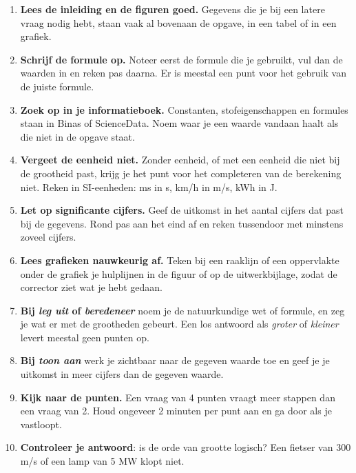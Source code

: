 {\small\opmaakproza
\begin{enumerate}[leftmargin=1.5em,itemsep=3pt,label=\textcolor{kleur1}{\sffamily\bfseries\arabic*}]
\item \textbf{Lees de inleiding en de figuren goed.} Gegevens die je bij een latere vraag nodig hebt, staan vaak
  al bovenaan de opgave, in een tabel of in een grafiek.
\item \textbf{Schrijf de formule op.} Noteer eerst de formule die je gebruikt, vul dan de waarden in en reken pas daarna.
  Er is meestal een punt voor het gebruik van de juiste formule.
\item \textbf{Zoek op in je informatieboek.} Constanten, stofeigenschappen en formules staan in Binas of ScienceData.
  Noem waar je een waarde vandaan haalt als die niet in de opgave staat.
\item \textbf{Vergeet de eenheid niet.} Zonder eenheid, of met een eenheid die niet bij de grootheid past, krijg je het
  punt voor het completeren van de berekening niet. Reken in SI-eenheden: ms in s, km/h in m/s, kWh in J.
\item \textbf{Let op significante cijfers.} Geef de uitkomst in het aantal cijfers dat past bij de gegevens.
  Rond pas aan het eind af en reken tussendoor met minstens zoveel cijfers.
\item \textbf{Lees grafieken nauwkeurig af.} Teken bij een raaklijn of een oppervlakte onder de grafiek je hulplijnen
  in de figuur of op de uitwerkbijlage, zodat de corrector ziet wat je hebt gedaan.
\item \textbf{Bij \emph{leg uit} of \emph{beredeneer}} noem je de natuurkundige wet of formule, en zeg je wat er met
  de grootheden gebeurt. Een los antwoord als \emph{groter} of \emph{kleiner} levert meestal geen punten op.
\item \textbf{Bij \emph{toon aan}} werk je zichtbaar naar de gegeven waarde toe en geef je je uitkomst in meer cijfers
  dan de gegeven waarde.
\item \textbf{Kijk naar de punten.} Een vraag van 4 punten vraagt meer stappen dan een vraag van 2. Houd ongeveer
  2 minuten per punt aan en ga door als je vastloopt.
\item \textbf{Controleer je antwoord}: is de orde van grootte logisch? Een fietser van 300 m/s of een lamp van 5 MW klopt niet.
\end{enumerate}\par}
